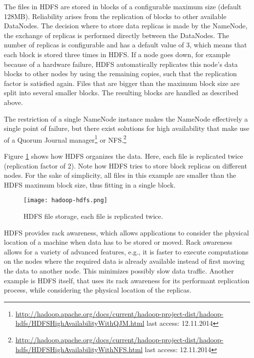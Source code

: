 The files in HDFS are stored in blocks of a configurable maximum size (default 128MB). Reliability arises from the replication of blocks to other available DataNodes. The decision where to store data replicas is made by the NameNode, the exchange of replicas is performed directly between the DataNodes. The number of replicas is configurable and has a default value of 3, which means that each block is stored three times in HDFS. If a node goes down, for example because of a hardware failure, HDFS automatically replicates this node's data blocks to other nodes by using the remaining copies, such that the replication factor is satisfied again. Files that are bigger than the maximum block size are split into several smaller blocks. The resulting blocks are handled as described above.

The restriction of a single NameNode instance makes the NameNode effectively a single point of failure, but there exist solutions for high availability that make use of a Quorum Journal manager\footnote{\url{http://hadoop.apache.org/docs/current/hadoop-project-dist/hadoop-hdfs/HDFSHighAvailabilityWithQJM.html} last access: 12.11.2014} or NFS.\footnote{\url{http://hadoop.apache.org/docs/current/hadoop-project-dist/hadoop-hdfs/HDFSHighAvailabilityWithNFS.html} last access: 12.11.2014}

Figure \ref{fig:hadoop-hdfs} shows how HDFS organizes the data. Here, each file is replicated twice (replication factor of 2). Note how HDFS tries to store block replicas on different nodes. For the sake of simplicity, all files in this example are smaller than the HDFS maximum block size, thus fitting in a single block.

\begin{figure}
  \centering
  \texttt{[image: hadoop-hdfs.png]}
  \caption[HDFS file storage]{HDFS file storage, each file is replicated twice.}
  \label{fig:hadoop-hdfs}
\end{figure}

HDFS provides rack awareness, which allows applications to consider the physical location of a machine when data has to be stored or moved. Rack awareness allows for a variety of advanced features, e.g., it is faster to execute computations on the nodes where the required data is already available instead of first moving the data to another node. This minimizes possibly slow data traffic. Another example is HDFS itself, that uses its rack awareness for its performant replication process, while considering the physical location of the replicas.

